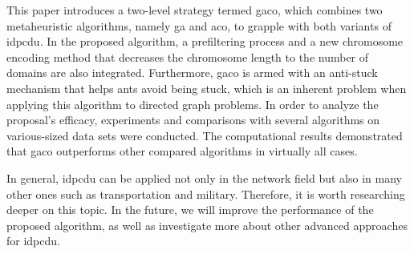 This paper introduces a two-level strategy termed \acrshort{gaco}, which combines two metaheuristic algorithms, namely \gls{ga} and \gls{aco}, to grapple with both variants of \gls{idpcdu}. In the proposed algorithm, a prefiltering process and a new chromosome encoding method that decreases the chromosome length to the number of domains are also integrated. Furthermore, \acrshort{gaco} is armed with an anti-stuck mechanism that helps ants avoid being stuck, which is an inherent problem when applying this algorithm to directed graph problems. In order to analyze the proposal’s efficacy, experiments and comparisons with several algorithms on various-sized data sets were conducted. The computational results demonstrated that \acrshort{gaco} outperforms other compared algorithms in virtually all cases.

In general, \gls{idpcdu} can be applied not only in the network field but also in many other ones such as transportation and military. Therefore, it is worth researching deeper on this topic. In the future, we will improve the performance of the proposed algorithm, as well as investigate more about other advanced approaches for \gls{idpcdu}.

